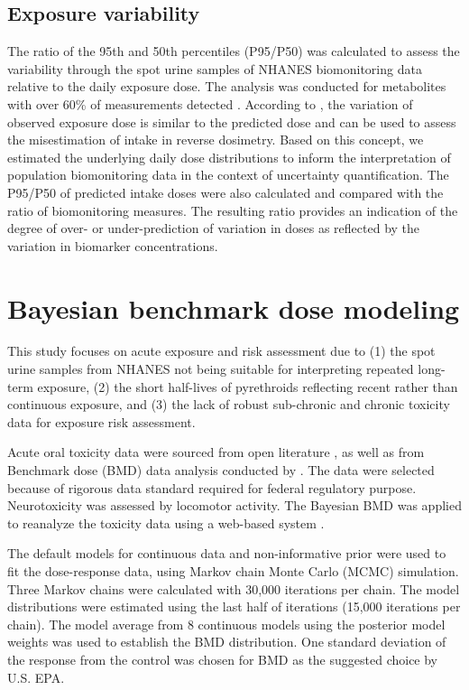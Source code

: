 \documentclass[toxics,article,submit,pdftex,moreauthors]{Definitions/mdpi}
\begin{document}
\subsection{Exposure variability}\label{exposure-variability}

The ratio of the 95th and 50th percentiles (P95/P50) was calculated to
assess the variability through the spot urine samples of NHANES
biomonitoring data relative to the daily exposure dose. The analysis was
conducted for metabolites with over 60\% of measurements detected
\citep{faure_evaluation_2020}. According to
\citet{aylward_interpreting_2012}, the variation of observed exposure
dose is similar to the predicted dose and can be used to assess the
misestimation of intake in reverse dosimetry. Based on this concept, we
estimated the underlying daily dose distributions to inform the
interpretation of population biomonitoring data in the context of
uncertainty quantification. The P95/P50 of predicted intake doses were
also calculated and compared with the ratio of biomonitoring measures.
The resulting ratio provides an indication of the degree of over- or
under-prediction of variation in doses as reflected by the variation in
biomarker concentrations.

\section{Bayesian benchmark dose
modeling}\label{bayesian-benchmark-dose-modeling}

This study focuses on acute exposure and risk assessment due to (1) the
spot urine samples from NHANES not being suitable for interpreting
repeated long-term exposure, (2) the short half-lives of pyrethroids
reflecting recent rather than continuous exposure, and (3) the lack of
robust sub-chronic and chronic toxicity data for exposure risk
assessment.

Acute oral toxicity data were sourced from open literature
\citep{wolansky_relative_2006}, as well as from Benchmark dose (BMD)
data analysis conducted by \citet{us2018der}.
The data were selected because of rigorous data standard required for
federal regulatory purpose. Neurotoxicity was assessed by locomotor
activity. The Bayesian BMD was applied to reanalyze the toxicity data
using a web-based system \citep{shao_kan_web_2018}.

The default models for continuous data and non-informative prior were
used to fit the dose-response data, using Markov chain Monte Carlo
(MCMC) simulation. Three Markov chains were calculated with 30,000
iterations per chain. The model distributions were estimated using the
last half of iterations (15,000 iterations per chain). The model average
from 8 continuous models using the posterior model weights was used to
establish the BMD distribution. One standard deviation of the response
from the control was chosen for BMD as the suggested choice by U.S. EPA.
\end{document}

